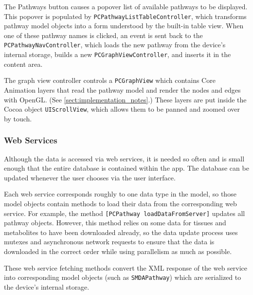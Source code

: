 The Pathways button causes a popover list of available pathways to be displayed.
This popover is populated by \texttt{PCPathwayListTableController}, which
transforms pathway model objects into a form understood by the built-in table
view. When one of these pathway names is clicked, an event is sent back to the
\texttt{PCPathwayNavController}, which loads the new pathway from the device's
internal storage, builds a new \texttt{PCGraphViewController}, and inserts it in
the content area.

The graph view controller controls a \texttt{PCGraphView} which contains Core
Animation layers that read the pathway model and render the nodes and edges with
OpenGL. (See \ref{sect:implementation_notes}.) These layers are put inside the
Cocoa object \texttt{UIScrollView}, which allows them to be panned and zoomed
over by touch.

\subsubsection{Web Services}
\label{sect:maw_web_services}

Although the data is accessed via web services, it is needed so often and is
small enough that the entire database is contained within the app. The database
can be updated whenever the user chooses via the user interface.

Each web service corresponds roughly to one data type in the model, so those
model objects contain methods to load their data from the corresponding web
service. For example, the method \texttt{[PCPathway loadDataFromServer]}
updates all pathway objects. However, this method relies on some data for
tissues and metabolites to have been downloaded already, so the data update
process uses mutexes and asynchronous network requests to ensure that the data
is downloaded in the correct order while using parallelism as much as possible.

These web service fetching methods convert the XML response of the web service
into corresponding model objects (such as \texttt{SMDAPathway}) which are
serialized to the device's internal storage.


